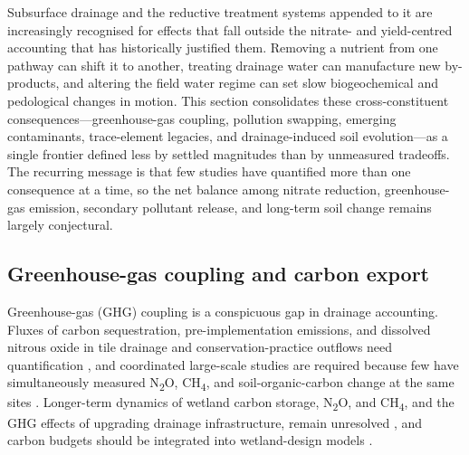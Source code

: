 Subsurface drainage and the reductive treatment systems appended to it are
increasingly recognised for effects that fall outside the nitrate- and
yield-centred accounting that has historically justified them. Removing a
nutrient from one pathway can shift it to another, treating drainage water can
manufacture new by-products, and altering the field water regime can set slow
biogeochemical and pedological changes in motion. This section consolidates
these cross-constituent consequences---greenhouse-gas coupling, pollution
swapping, emerging contaminants, trace-element legacies, and drainage-induced
soil evolution---as a single frontier defined less by settled magnitudes than
by unmeasured tradeoffs. The recurring message is that few studies have
quantified more than one consequence at a time, so the net balance among
nitrate reduction, greenhouse-gas emission, secondary pollutant release, and
long-term soil change remains largely conjectural.

\subsection{Greenhouse-gas coupling and carbon export}

Greenhouse-gas (GHG) coupling is a conspicuous gap in drainage accounting.
Fluxes of carbon sequestration, pre-implementation emissions, and dissolved
nitrous oxide in tile drainage and conservation-practice outflows need
quantification \parencite{Mitchell2023}, and coordinated large-scale studies
are required because few have simultaneously measured N\textsubscript{2}O,
CH\textsubscript{4}, and soil-organic-carbon change at the same sites
\parencite{Hall2025}. Longer-term dynamics of wetland carbon storage,
N\textsubscript{2}O, and CH\textsubscript{4}, and the GHG effects of upgrading
drainage infrastructure, remain unresolved \parencite{Mitchell2022}, and carbon
budgets should be integrated into wetland-design models \parencite{Kadlec2012}.

